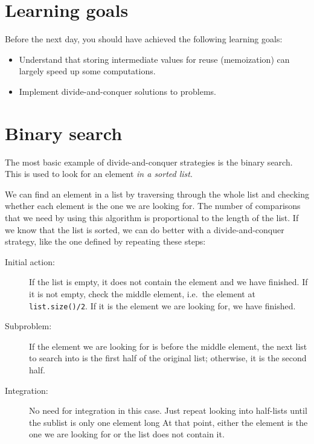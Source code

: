 \documentclass{article}
\begin{document}
\section*{Learning goals}
\label{sec:learning-goals}

Before the next day, you should have achieved the following learning
goals: 

\begin{itemize}
\item Understand that storing intermediate values for reuse
  (memoization) can largely speed up some computations. 
\item Implement divide-and-conquer solutions to problems. 
\end{itemize}

\section{Binary search}
\label{sec:binary-search}

The most basic example of divide-and-conquer strategies is the binary
search. This is used to look for an element \emph{in a sorted list}. 

We can find an element in a list by traversing through the whole list
and checking whether each element is the one we are looking for. The
number of comparisons that we need by using this algorithm is
proportional to the length of the list. If we know that the list is
sorted, we can do better with a divide-and-conquer strategy, 
like the one defined by repeating these steps: 

\begin{description}
\item[Initial action: ] If the list is empty, it does not contain the
  element and we have finished. 
  If it is not empty, check the middle element, i.e.~the
  element at \verb+list.size()/2+. If it is the element we are looking
  for, we have finished. 
\item[Subproblem: ] If the element we are looking for is before the
  middle element, the next list to search into is the first half of
  the original list; otherwise, it is the second half.
\item[Integration: ] No need for integration in this case. Just repeat
  looking into half-lists until the sublist is only one element long 
  At that point, either the element is the one we are looking for or
  the list does not contain it. 
\end{description}
\end{document}
